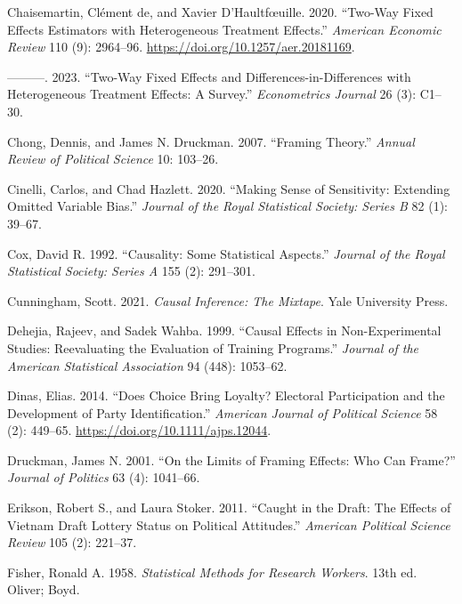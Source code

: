 \documentclass[
]{article}
\newlength{\cslhangindent}
\newenvironment{CSLReferences}[2] %
 {\begin{list}{}{%
  \setlength{\itemindent}{0pt}
  \setlength{\leftmargin}{0pt}
  \setlength{\parsep}{0pt}
  \ifodd #1
   \setlength{\leftmargin}{\cslhangindent}
   \setlength{\itemindent}{-1\cslhangindent}
  \fi
  \setlength{\itemsep}{#2\baselineskip}}}
 {\end{list}}
\begin{document}
\begin{CSLReferences}{1}{0}
Chaisemartin, Clément de, and Xavier D'Haultfœuille. 2020. {``Two-Way Fixed Effects Estimators with Heterogeneous Treatment Effects.''} \emph{American Economic Review} 110 (9): 2964--96. \url{https://doi.org/10.1257/aer.20181169}.

---------. 2023. {``Two-Way Fixed Effects and Differences-in-Differences with Heterogeneous Treatment Effects: A Survey.''} \emph{Econometrics Journal} 26 (3): C1--30.

Chong, Dennis, and James N. Druckman. 2007. {``Framing Theory.''} \emph{Annual Review of Political Science} 10: 103--26.

Cinelli, Carlos, and Chad Hazlett. 2020. {``Making Sense of Sensitivity: Extending Omitted Variable Bias.''} \emph{Journal of the Royal Statistical Society: Series B} 82 (1): 39--67.

Cox, David R. 1992. {``Causality: Some Statistical Aspects.''} \emph{Journal of the Royal Statistical Society: Series A} 155 (2): 291--301.

Cunningham, Scott. 2021. \emph{Causal Inference: The Mixtape}. Yale University Press.

Dehejia, Rajeev, and Sadek Wahba. 1999. {``Causal Effects in Non-Experimental Studies: Reevaluating the Evaluation of Training Programs.''} \emph{Journal of the American Statistical Association} 94 (448): 1053--62.

Dinas, Elias. 2014. {``Does Choice Bring Loyalty? {Electoral} Participation and the Development of Party Identification.''} \emph{American Journal of Political Science} 58 (2): 449--65. \url{https://doi.org/10.1111/ajps.12044}.

Druckman, James N. 2001. {``On the Limits of Framing Effects: Who Can Frame?''} \emph{Journal of Politics} 63 (4): 1041--66.

Erikson, Robert S., and Laura Stoker. 2011. {``Caught in the Draft: The Effects of {Vietnam} Draft Lottery Status on Political Attitudes.''} \emph{American Political Science Review} 105 (2): 221--37.

Fisher, Ronald A. 1958. \emph{Statistical Methods for Research Workers}. 13th ed. Oliver; Boyd.


\end{CSLReferences}
\end{document}
